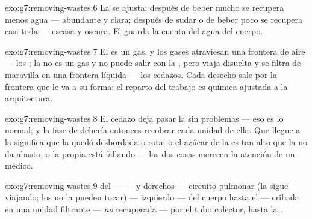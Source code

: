 \begin{solution}{exo:g7:removing-wastes:6}
La  se ajusta: después de beber mucho se recupera menos
agua ---  abundante y clara; después de sudar o de beber poco se
recupera casi toda ---  escasa y oscura. El  guarda la cuenta
del agua del cuerpo.
\end{solution}

\begin{solution}{exo:g7:removing-wastes:7}
El  es un gas, y los gases atraviesan una frontera de
aire --- los ; la  no es un gas y no puede salir con la
, pero viaja disuelta y se filtra de maravilla en una
frontera líquida --- los cedazos. Cada desecho sale por la frontera que
le va a su forma: el reparto del trabajo es química ajustada a la
arquitectura.
\end{solution}

\begin{solution}{exo:g7:removing-wastes:8}
El cedazo deja pasar la  sin problemas --- eso es lo normal; y
la fase de  debería entonces recobrar cada unidad de ella.
Que llegue  a la  significa que la  quedó
desbordada o rota: o el azúcar de la  es tan alto que la
 no da abasto, o la propia  está fallando ---
las dos cosas merecen la atención de un médico.
\end{solution}

\begin{solution}{exo:g7:removing-wastes:9}
 del  ---  ---  y  derechos ---
circuito pulmonar (la  sigue viajando; los  no la pueden
tocar) ---  izquierdo ---  del cuerpo hasta el  ---
cribada en una unidad filtrante --- \emph{no} recuperada --- por el
tubo colector, hasta la .
\end{solution}

